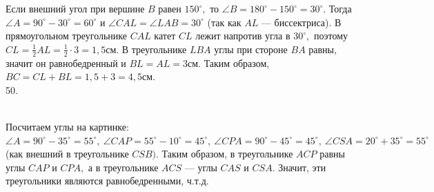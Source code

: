 \documentclass[12pt]{article}
\begin{document}
Если внешний угол при вершине $B$ равен $150^\circ,$ то $\angle B=180^\circ-150^\circ=30^\circ.$ Тогда $\angle A=90^\circ-30^\circ=60^\circ$ и $\angle CAL=\angle LAB=30^\circ$ (так как $AL$ --- биссектриса). В прямоугольном треугольнике $CAL$ катет $CL$ лежит напротив угла в $30^\circ,$ поэтому $CL=\frac{1}{2}AL=\frac{1}{2}\cdot3=1,5$см. В треугольнике $LBA$ углы при стороне $BA$ равны, значит он равнобедренный и $BL=AL=3$см. Таким образом, $BC=CL+BL=1,5+3=4,5$см.\\
50. \begin{figure}[ht!]
\end{figure}\\
Посчитаем углы на картинке: $\angle A=90^\circ-35^\circ=55^\circ,\ \angle CAP=55^\circ-10^\circ=45^\circ,\ \angle CPA=90^\circ-45^\circ=45^\circ,\ \angle CSA=20^\circ+35^\circ=55^\circ$ (как внешний в треугольнике $CSB).$ Таким образом, в треугольнике $ACP$ равны углы $CAP$ и $CPA,$ а в треугольнике $ACS$ --- углы $CAS$ и $CSA.$ Значит, эти треугольники являются равнобедренными, ч.т.д.\\
\end{document}
